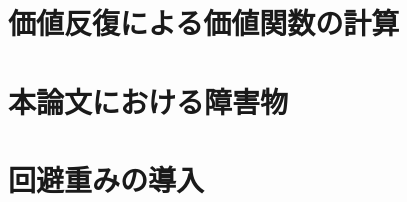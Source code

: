 \section{価値反復による価値関数の計算} \label{section:価値関数}


\section{本論文における障害物} \label{section:障害物}


\section{回避重みの導入} \label{section:回避重み}

